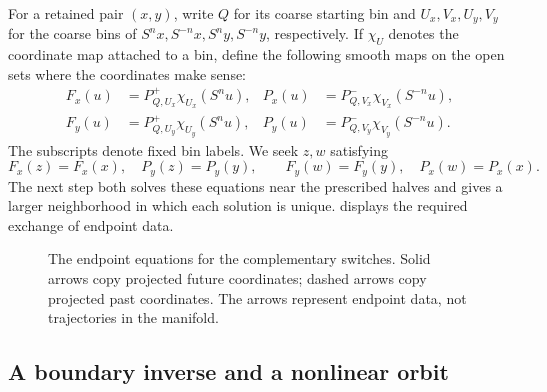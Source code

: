 For a retained pair $(x,y)$, write $Q$ for its coarse starting bin and
$U_x,V_x,U_y,V_y$ for the coarse bins of
$S^nx,S^{-n}x,S^ny,S^{-n}y$, respectively.  If $\chi_U$ denotes the
coordinate map attached to a bin, define the following smooth maps on
the open sets where the coordinates make sense:
\begin{equation}\label{eq:endpoint-maps}
 \begin{aligned}
 F_x(u)&=P^+_{Q,U_x}\chi_{U_x}(S^nu),&
 P_x(u)&=P^-_{Q,V_x}\chi_{V_x}(S^{-n}u),\\
 F_y(u)&=P^+_{Q,U_y}\chi_{U_y}(S^nu),&
 P_y(u)&=P^-_{Q,V_y}\chi_{V_y}(S^{-n}u).
 \end{aligned}
\end{equation}
The subscripts denote fixed bin labels.  We seek $z,w$ satisfying
\begin{equation}\label{eq:four-switch-equations}
 F_x(z)=F_x(x),\quad P_y(z)=P_y(y),\qquad
 F_y(w)=F_y(y),\quad P_x(w)=P_x(x).
\end{equation}
The next step both solves these equations near the prescribed halves
and gives a larger neighborhood in which each solution is unique.
 displays the required exchange of endpoint data.

\begin{figure}[htbp]
\centering
{}
\caption{The endpoint equations for the complementary switches.
Solid arrows copy projected future coordinates; dashed arrows copy
projected past coordinates.  The arrows represent endpoint data,
not trajectories in the manifold.}
\label{fig:switch-data}
\end{figure}

\subsection{A boundary inverse and a nonlinear orbit}

